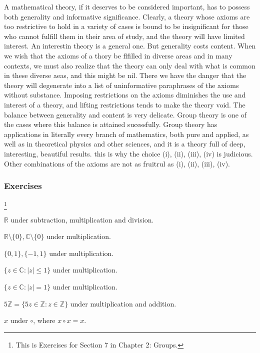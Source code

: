 \documentclass[11pt]{amsbook}
\begin{document}

	A mathematical theory, if it deserves to be considered important, has to possess both generality and informative significance. Clearly, a theory whose axioms are too restrictive to hold in a variety of cases is bound to be insignificant for those who cannot fulfill them in their area of study, and the theory will have limited interest. An interestin theory is a general one. But generality costs content. When we wish that the axioms of a thory be flfilled in diverse areas and in many contexts, we must also realize that the theory can only deal with what is common in these diverse aeas, and this might be nil. There we have the danger that the theory will degenerate into a list of uninformative paraphrases of the axioms without substance. Imposing restrictions on the axioms diminishes the use and interest of a theory, and lifting restrictions tends to make the theory void. The balance between generality and content is very delicate. Group theory is one of the cases where this balance is attained sucessfully. Group theory has applications in literally every branch of mathematics, both pure and applied, as well as in theoretical physics and other sciences, and it is a theory full of deep, interesting, beautiful results. this is why the choice (i), (ii), (iii), (iv) is judicious. Other combinations of the axioms are not as fruitrul as (i), (ii), (iii), (iv).

	\subsubsection{Exercises}\footnote{This is Exercises for Section 7 in Chapter 2: Groups.}

	\begin{hEnumerateArabic}
		\item
	    \begin{hEnumerateAlpha}
		    \item ${\mathbb{R}}$ under subtraction, multiplication and division.
		    \item ${\mathbb{R}}\setminus\{0\}, {\mathbb{C}}\setminus\{0\}$ under multiplication.
		    \item $\{0, 1\}, \{-1,1\}$ under multiplication.
		    \item $\{z \in \mathbb{C}: |z| \leqslant 1\}$ under multiplication.
		    \item $\{z \in \mathbb{C}: |z| = 1\}$ under multiplication.
		    \item $5\mathbb{Z} = \{5z \in \mathbb{Z}: z \in \mathbb{Z}\}$ under multiplication and addition.
		    \item ${x}$ under $\circ$, where $x \circ x = x$.    
	    \end{hEnumerateAlpha}
	\end{hEnumerateArabic}
\end{document}
